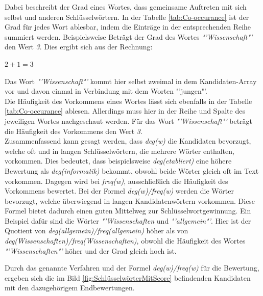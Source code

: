 			Dabei beschreibt der Grad eines Wortes, dass gemeinsame Auftreten mit sich selbst und anderen Schlüsselwörtern. In der Tabelle \ref{tab:Co-occurance} ist der Grad für jedes Wort ablesbar, indem die Einträge in der entsprechenden Reihe summiert werden. Beispielsweise Beträgt der Grad des Wortes \textit{"'Wissenschaft"'} den Wert \textit{3}. Dies ergibt sich aus der Rechnung:
			\begin{center}
				$2 + 1 = 3$
			\end{center}
			Das Wort \textit{"'Wissenschaft"'} kommt hier selbst zweimal in dem Kandidaten-Array vor und davon einmal in Verbindung mit dem Worten "'jungen"'.\\
			Die Häufigkeit des Vorkommens eines Wortes lässt sich ebenfalls in der Tabelle \ref{tab:Co-occurance} ablesen. Allerdings muss hier in der Reihe und Spalte des jeweiligen Wortes nachgeschaut werden. Für das Wort \textit{"'Wissenschaft"'} beträgt die Häufigkeit des Vorkommens den Wert \textit{3}.\\
			Zusammenfassend kann gesagt werden, dass \textit{deg(w)} die Kandidaten bevorzugt, welche oft und in langen Schlüsselwörtern, die mehrere Wörter enthalten, vorkommen. Dies bedeutet, dass beispielsweise \textit{deg(etabliert)} eine höhere Bewertung als \textit{deg(informatik)} bekommt, obwohl beide Wörter gleich oft im Text vorkommen. Dagegen wird bei \textit{freq(w)}, ausschließlich die Häufigkeit des Vorkommens bewertet. Bei der Formel \textit{deg(w)/freq(w)} werden die Wörter bevorzugt, welche überwiegend in langen Kandidatenwörtern vorkommen. Diese Formel bietet dadurch einen guten Mittelweg zur Schlüsselwortgewinnung. Ein Beispiel dafür sind die Wörter \textit{"'Wissenschaften} und \textit{"'allgemein"'}. Hier ist der Quotient von \textit{deg(allgemein)/freq(allgemein)} höher als von \textit{deg(Wissenschaften)/freq(Wissenschaften)}, obwohl die Häufigkeit des Wortes \textit{"'Wissenschaften"'} höher und der Grad gleich hoch ist. \cite{rose2010automatic}
			
			Durch das genannte Verfahren und der Formel \textit{deg(w)/freq(w)} für die Bewertung, ergeben sich die im Bild \ref{fig:SchlüsselwörterMitScore} befindenden Kandidaten mit den dazugehörigem Endbewertungen. \cite{rose2010automatic}
			

